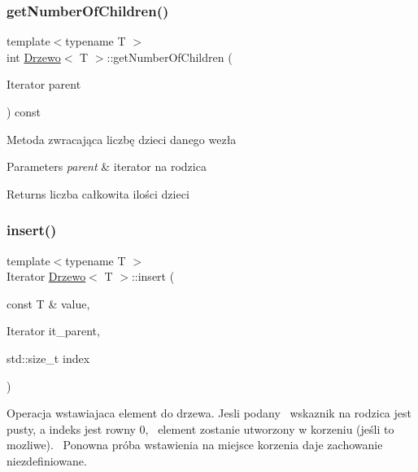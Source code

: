 \subsubsection{\texorpdfstring{get\+Number\+Of\+Children()}{getNumberOfChildren()}}
{\footnotesize\ttfamily template$<$typename T $>$ \\
int \hyperlink{class_drzewo}{Drzewo}$<$ T $>$\+::get\+Number\+Of\+Children (\begin{DoxyParamCaption}\item[{Iterator}]{parent }\end{DoxyParamCaption}) const\hspace{0.3cm}{\ttfamily [inline]}}

Metoda zwracająca liczbę dzieci danego wezła 
\begin{DoxyParams}{Parameters}
{\em parent} & iterator na rodzica \\
\hline
\end{DoxyParams}
\begin{DoxyReturn}{Returns}
liczba całkowita ilości dzieci 
\end{DoxyReturn}
\mbox{\label{class_drzewo_a2a8b76e1514a1823c0ee95e96b1a5553}} 
\subsubsection{\texorpdfstring{insert()}{insert()}}
{\footnotesize\ttfamily template$<$typename T $>$ \\
Iterator \hyperlink{class_drzewo}{Drzewo}$<$ T $>$\+::insert (\begin{DoxyParamCaption}\item[{const T \&}]{value,  }\item[{Iterator}]{it\+\_\+parent,  }\item[{std\+::size\+\_\+t}]{index }\end{DoxyParamCaption})\hspace{0.3cm}{\ttfamily [inline]}}

Operacja wstawiajaca element do drzewa. Jesli podany~\newline
wskaznik na rodzica jest pusty, a indeks jest rowny 0,~\newline
element zostanie utworzony w korzeniu (jeśli to mozliwe).~\newline
Ponowna próba wstawienia na miejsce korzenia daje zachowanie niezdefiniowane.


